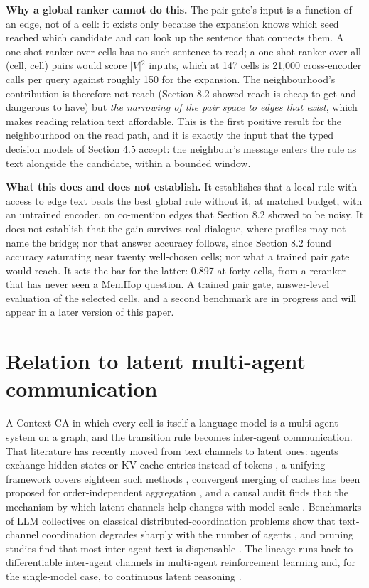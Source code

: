 \documentclass[11pt]{article}
\begin{document}
\textbf{Why a global ranker cannot do this.} The pair gate's input is a function of an edge, not of a cell: it exists only because the expansion knows which seed reached which candidate and can look up the sentence that connects them. A one-shot ranker over cells has no such sentence to read; a one-shot ranker over all (cell, cell) pairs would score $|V|$$^2$ inputs, which at 147 cells is 21,000 cross-encoder calls per query against roughly 150 for the expansion. The neighbourhood's contribution is therefore not reach (Section 8.2 showed reach is cheap to get and dangerous to have) but \emph{the narrowing of the pair space to edges that exist}, which makes reading relation text affordable. This is the first positive result for the neighbourhood on the read path, and it is exactly the input that the typed decision models of Section 4.5 accept: the neighbour's message enters the rule as text alongside the candidate, within a bounded window.

\textbf{What this does and does not establish.} It establishes that a local rule with access to edge text beats the best global rule without it, at matched budget, with an untrained encoder, on co-mention edges that Section 8.2 showed to be noisy. It does not establish that the gain survives real dialogue, where profiles may not name the bridge; nor that answer accuracy follows, since Section 8.2 found accuracy saturating near twenty well-chosen cells; nor what a trained pair gate would reach. It sets the bar for the latter: 0.897 at forty cells, from a reranker that has never seen a MemHop question. A trained pair gate, answer-level evaluation of the selected cells, and a second benchmark are in progress and will appear in a later version of this paper.

\section{Relation to latent multi-agent communication}

A Context-CA in which every cell is itself a language model is a multi-agent system on a graph, and the transition rule becomes inter-agent communication. That literature has recently moved from text channels to latent ones: agents exchange hidden states or KV-cache entries instead of tokens \cite{latentmas}, a unifying framework covers eighteen such methods \cite{beyondtokens}, convergent merging of caches has been proposed for order-independent aggregation \cite{crdtkv}, and a causal audit finds that the mechanism by which latent channels help changes with model scale \cite{causalaudit}. Benchmarks of LLM collectives on classical distributed-coordination problems show that text-channel coordination degrades sharply with the number of agents \cite{agentsnet}, and pruning studies find that most inter-agent text is dispensable \cite{agentprune}. The lineage runs back to differentiable inter-agent channels in multi-agent reinforcement learning \cite{dial,commnet} and, for the single-model case, to continuous latent reasoning \cite{coconut}.
\end{document}
